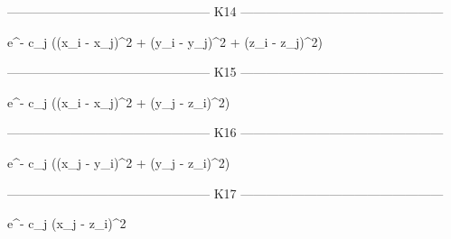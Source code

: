 ------------------------------------------------
   K14
------------------------------------------------

e^{- c_{j} \left(\left(x_{i} - x_{j}\right)^{2} + \left(y_{i} - y_{j}\right)^{2} + \left(z_{i} - z_{j}\right)^{2}\right)}

------------------------------------------------
   K15
------------------------------------------------

e^{- c_{j} \left(\left(x_{i} - x_{j}\right)^{2} + \left(y_{j} - z_{i}\right)^{2}\right)}

------------------------------------------------
   K16
------------------------------------------------

e^{- c_{j} \left(\left(x_{j} - y_{i}\right)^{2} + \left(y_{j} - z_{i}\right)^{2}\right)}

------------------------------------------------
   K17
------------------------------------------------

e^{- c_{j} \left(x_{j} - z_{i}\right)^{2}}

